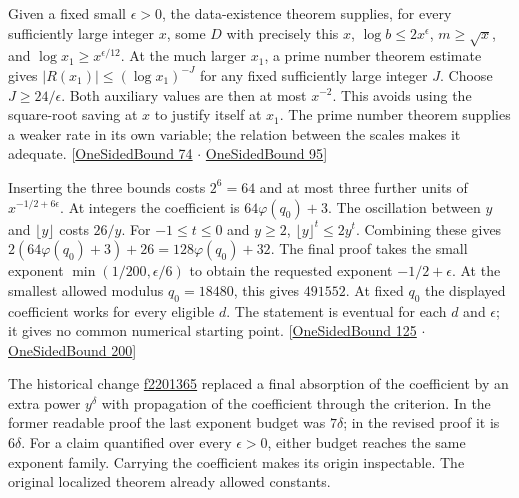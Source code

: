 \documentclass[12pt,letterpaper]{article}
\begin{document}
Given a fixed small $\epsilon>0$, the data-existence theorem supplies, for every sufficiently large integer $x$, some $D$ with precisely this $x$, $\log b\le2x^\epsilon$, $m\ge\sqrt{x}$, and $\log x_1\ge x^{\epsilon/12}$. At the much larger $x_1$, a prime number theorem estimate gives $|R(x_1)|\le(\log x_1)^{-J}$ for any fixed sufficiently large integer $J$. Choose $J\ge24/\epsilon$. Both auxiliary values are then at most $x^{-2}$. This avoids using the square-root saving at $x$ to justify itself at $x_1$. The prime number theorem supplies a weaker rate in its own variable; the relation between the scales makes it adequate. {\small\sffamily\color{mute}[\href{https://github.com/leanprover-community/riemann-hypothesis/blob/e063a923620ee7787b4a1270421478645bf66bdb/src/New/Reduction/OneSidedBound.lean#L74}{OneSidedBound 74} $\cdot$ \href{https://github.com/leanprover-community/riemann-hypothesis/blob/e063a923620ee7787b4a1270421478645bf66bdb/src/New/Reduction/OneSidedBound.lean#L95}{OneSidedBound 95}]}

Inserting the three bounds costs $2^6=64$ and at most three further units of $x^{-1/2+6\epsilon}$. At integers the coefficient is $64\varphi(q_0)+3$. The oscillation between $y$ and $\lfloor y\rfloor$ costs $26/y$. For $-1\le t\le0$ and $y\ge2$, $\lfloor y\rfloor^t\le2y^t$. Combining these gives $2(64\varphi(q_0)+3)+26=128\varphi(q_0)+32$. The final proof takes the small exponent $\min(1/200,\epsilon/6)$ to obtain the requested exponent $-1/2+\epsilon$. At the smallest allowed modulus $q_0=18480$, this gives $491552$. At fixed $q_0$ the displayed coefficient works for every eligible $d$. The statement is eventual for each $d$ and $\epsilon$; it gives no common numerical starting point. {\small\sffamily\color{mute}[\href{https://github.com/leanprover-community/riemann-hypothesis/blob/e063a923620ee7787b4a1270421478645bf66bdb/src/New/Reduction/OneSidedBound.lean#L125}{OneSidedBound 125} $\cdot$ \href{https://github.com/leanprover-community/riemann-hypothesis/blob/e063a923620ee7787b4a1270421478645bf66bdb/src/New/Reduction/OneSidedBound.lean#L200}{OneSidedBound 200}]}

The historical change \href{https://github.com/leanprover-community/riemann-hypothesis/commit/f2201365d2d57b1deb4fd330aa0da37213457074}{f2201365} replaced a final absorption of the coefficient by an extra power $y^\delta$ with propagation of the coefficient through the criterion. In the former readable proof the last exponent budget was $7\delta$; in the revised proof it is $6\delta$. For a claim quantified over every $\epsilon>0$, either budget reaches the same exponent family. Carrying the coefficient makes its origin inspectable. The original localized theorem already allowed constants.
\end{document}
